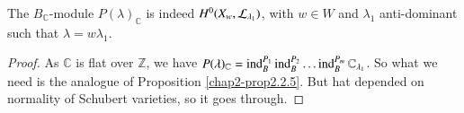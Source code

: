\begin{lemma}\label{chap7-lem7.3.2}
The $B_{\mathbb{C}}$-module $P(\lambda)_{\mathbb{C}}$ is indeed
$H^{0}(X_{w},\mathcal{L}_{\lambda_{1}})$, with $w\in W$ and $\lambda_{1}$
anti-dominant such that $\lambda=w\lambda_{1}$.
\end{lemma}

\begin{proof}
As $\mathbb{C}$ is flat over $\mathbb{Z}$, we have
$P(\lambda)_{\mathbb{C}}=\operatorname{ind}^{P_{1}}_{B}\operatorname{ind}^{P_{2}}_{B}\ldots
\operatorname{ind}^{P_{m}}_{B}\mathbb{C}_{\lambda_{1}}$. So what we need is the
analogue of Proposition \ref{chap2-prop2.2.5}. But hat depended on
normality of Schubert varieties, so it goes through.
\end{proof}





